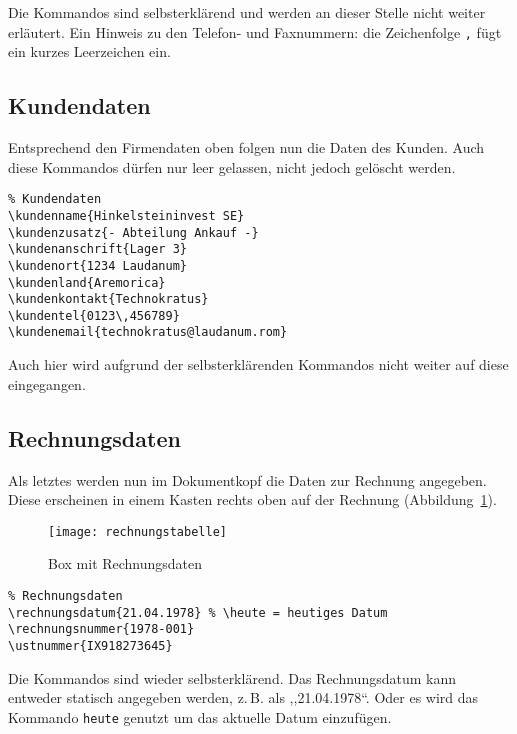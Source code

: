 \documentclass[11pt,pdftex]{scrartcl}
\newcommand{\bs}{\symbol{'134}}
\newcommand{\Cmd}[1]{\texttt{\def\{{\char`\{}\def\}{\char`\}}\bs#1}}
\begin{document}
Die Kommandos sind selbsterklärend und werden an dieser Stelle nicht weiter erläutert. Ein Hinweis zu den Telefon- und Faxnummern: die Zeichenfolge \Cmd{,} fügt ein kurzes Leerzeichen ein.

\subsection{Kundendaten}

Entsprechend den Firmendaten oben folgen nun die Daten des Kunden. Auch diese Kommandos dürfen nur leer gelassen, nicht jedoch gelöscht werden.

\begin{verbatim}
% Kundendaten
\kundenname{Hinkelsteininvest SE}
\kundenzusatz{- Abteilung Ankauf -}
\kundenanschrift{Lager 3}
\kundenort{1234 Laudanum}
\kundenland{Aremorica}
\kundenkontakt{Technokratus}
\kundentel{0123\,456789}
\kundenemail{technokratus@laudanum.rom}
\end{verbatim}

Auch hier wird aufgrund der selbsterklärenden Kommandos nicht weiter auf diese eingegangen.

\subsection{Rechnungsdaten}

Als letztes werden nun im Dokumentkopf die Daten zur Rechnung angegeben. Diese erscheinen in einem Kasten rechts oben auf der Rechnung (Abbildung~\ref{rechtab}).

\begin{figure}[htbp]
\begin{center}
\texttt{[image: rechnungstabelle]}

\vspace{-1em}

\caption{Box mit Rechnungsdaten}
\label{rechtab}
\end{center}
\end{figure}

\begin{verbatim}
% Rechnungsdaten
\rechnungsdatum{21.04.1978} % \heute = heutiges Datum
\rechnungsnummer{1978-001}
\ustnummer{IX918273645}
\end{verbatim}

Die Kommandos sind wieder selbsterklärend. Das Rechnungsdatum kann entweder statisch angegeben werden, z.\,B. als ,,21.04.1978``. Oder es wird das Kommando \Cmd{heute} genutzt um das aktuelle Datum einzufügen.
\end{document}
